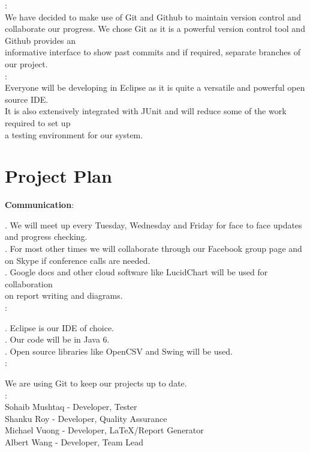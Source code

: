 \documentclass[a4paper]{article}
\begin{document}
: \\
\indent We have decided to make use of Git and Github to maintain version control and collaborate 
our progress. We chose Git as it is a powerful version control tool and Github provides an  \\
informative interface to show past commits and if required, separate branches of our project. \\

: \\
\indent Everyone will be developing in Eclipse as it is quite a versatile and powerful open source IDE. \\
It is also extensively integrated with JUnit and will reduce some of the work required to set up \\
a testing environment for our system.

\newpage

\section {Project Plan}

{\bf Communication}: 

.  We will meet up every Tuesday, Wednesday and Friday for face to face updates and progress checking. \\
. For most other times we will collaborate through our Facebook group page and \\
on Skype if conference calls are needed. \\
. Google docs and other cloud software like LucidChart will be used for collaboration \\
 on report writing and diagrams. \\

:

\indent{}. Eclipse is our IDE of choice. \\
\indent{}. Our code will be in Java 6. \\
\indent{}. Open source libraries like OpenCSV and Swing will be used. \\

:

We are using Git to keep our projects up to date. \\

: \\
\indent\indent Sohaib Mushtaq - Developer, Tester \\
\indent\indent Shanku Roy - Developer, Quality Assurance \\
\indent\indent Michael Vuong - Developer, LaTeX/Report Generator \\
\indent\indent Albert Wang -  Developer, Team Lead \\
\end{document}
